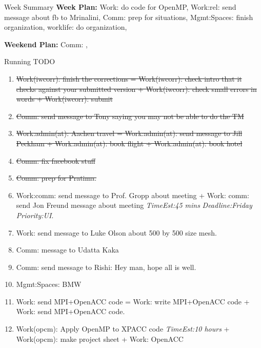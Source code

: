 \documentclass[serif, mathserif, final]{beamer}
\newcommand{\doneTask}[1]{\tiny \item \tiny \sout{#1}}
\newcommand{\te}[1]{\textit{TimeEst:}\textit{#1}}
\newcommand{\dl}[1]{\textit{Deadline:}\textit{#1}}
\newcommand{\pr}[1]{\textit{Priority:}\textit{#1}}
\begin{document}
\begin{frame}
\begin{columns}
    \begin{column}{0.50\linewidth}
      \begin{block}{Week Summary}
        {\tiny \textbf{Week Plan:} Work: do code for OpenMP, Work:rel:
          send message about fb to Mrinalini, Comm: prep for situations, Mgmt:Spaces:
          finish organization, worklife: do organization,}

        {\tiny \textbf{Weekend Plan:} Comm: , } 
      \end{block} 
      \begin{block}{Running TODO} %
        \begin{enumerate}           
        \doneTask{Work(iwcorr): finish the corrections = Work(iwcorr): check intro
          that it checks against your submitted version + Work(iwcorr): check
          small errors in words + Work(iwcorr): submit} 
        
        \doneTask{Comm: send message to Tony saying you may not be
          able to do the TM} 

      \doneTask{Work:admin(at): Aachen travel = Work:admin(at): send
      message to Jill Peckham + Work:admin(at): book flight +
      Work:admin(at): book hotel} 
      
      \doneTask{Comm: fix facebook stuff}
      
      \doneTask{ Comm: prep for Pratima.} 
      
    \item \small Work:comm: send message to Prof. Gropp about meeting
      + Work: comm: send Jon Freund message about meeting \te{45 mins}
      \dl{Friday} \pr{UI}. 
      
    \item \small Work: send message to Luke Olson about 500 by 500
      size mesh. 

    \item \small Comm: message to Udatta Kaka 
  
    \item \small Comm: send message to Rishi: Hey man, hope all is well. 
     
    \item \small Mgmt:Spaces: BMW 
      \small \item \small Work: send MPI+OpenACC code = Work: write MPI+OpenACC code + Work: send MPI+OpenACC code. 
      
    \item \small  Work(opcm): Apply OpenMP to XPACC code \te{10 hours}
      +  Work(opcm): make project sheet +  Work: OpenACC 
      

\end{enumerate}
\end{block}
\end{column}
\end{columns}
\end{frame}
\end{document}
